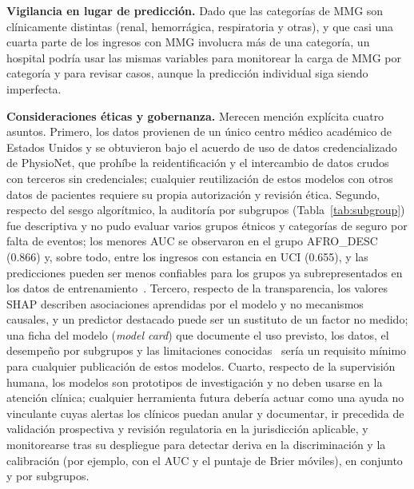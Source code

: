 \documentclass[healthcare,article,submit,pdftex,moreauthors]{Definitions/mdpi_es}
\begin{document}
\textbf{Vigilancia en lugar de predicción.} Dado que las categorías de MMG son
clínicamente distintas (renal, hemorrágica, respiratoria y otras), y que casi una cuarta parte
de los ingresos con MMG involucra más de una categoría, un hospital podría usar las mismas
variables para monitorear la carga de MMG por categoría y para revisar casos, aunque la predicción
individual siga siendo imperfecta.

\textbf{Consideraciones éticas y gobernanza.} Merecen mención explícita cuatro asuntos. Primero, los datos provienen de un único centro médico académico de
Estados Unidos y se obtuvieron bajo el acuerdo de uso de datos credencializado de PhysioNet, que prohíbe la reidentificación y el intercambio de datos
crudos con terceros sin credenciales; cualquier reutilización de estos modelos con otros datos de pacientes requiere su propia autorización y revisión ética.
Segundo, respecto del sesgo algorítmico, la auditoría por subgrupos (Tabla~\ref{tab:subgroup}) fue descriptiva y no pudo evaluar varios grupos étnicos y categorías de seguro por falta de eventos; los menores
AUC se observaron en el grupo AFRO\_DESC (0.866) y, sobre todo, entre los ingresos con estancia en UCI (0.655), y las predicciones pueden ser menos confiables para los
grupos ya subrepresentados en los datos de entrenamiento~\cite{Obermeyer2019Bias,Rajkomar2018Fairness}. Tercero, respecto de la transparencia, los valores SHAP describen asociaciones aprendidas por el modelo y no
mecanismos causales, y un predictor destacado puede ser un sustituto de un factor no medido; una ficha del modelo (\emph{model card}) que documente el uso previsto, los datos, el desempeño por
subgrupos y las limitaciones conocidas~\cite{Mitchell2019ModelCards} sería un requisito mínimo para cualquier publicación de estos modelos. Cuarto, respecto de la supervisión humana, los modelos son prototipos de investigación y
no deben usarse en la atención clínica; cualquier herramienta futura debería actuar como una ayuda no vinculante cuyas alertas los clínicos puedan anular y documentar, ir precedida de
validación prospectiva y revisión regulatoria en la jurisdicción aplicable, y monitorearse tras su despliegue para detectar deriva en la discriminación y la calibración (por ejemplo, con el AUC y el puntaje de Brier móviles), en
conjunto y por subgrupos.
\end{document}
